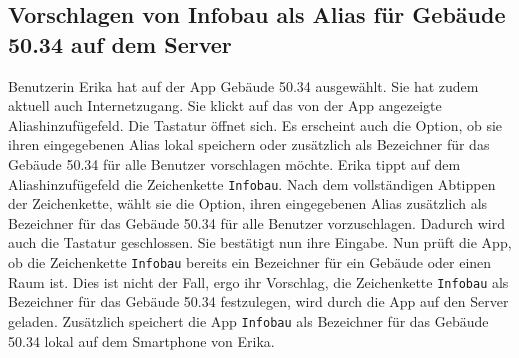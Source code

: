 \subsection{Vorschlagen von Infobau als Alias für Gebäude 50.34 auf dem Server}

Benutzerin Erika hat auf der App Gebäude 50.34 ausgewählt. 
Sie hat zudem aktuell auch Internetzugang. 
Sie klickt auf das von der App angezeigte Aliashinzufügefeld. 
Die Tastatur öffnet sich.  
Es erscheint auch die Option, ob sie ihren eingegebenen Alias lokal speichern oder zusätzlich als Bezeichner für das Gebäude 50.34 für alle Benutzer vorschlagen möchte. 
Erika tippt auf dem Aliashinzufügefeld die Zeichenkette \texttt{Infobau}.
Nach dem vollständigen Abtippen der Zeichenkette, wählt sie die Option, ihren eingegebenen Alias zusätzlich als Bezeichner für das Gebäude 50.34 für alle Benutzer vorzuschlagen. 
Dadurch wird auch die Tastatur geschlossen. 
Sie bestätigt nun ihre Eingabe. 
Nun prüft die App, ob die Zeichenkette \texttt{Infobau} bereits ein Bezeichner für ein Gebäude oder einen Raum ist. 
Dies ist nicht der Fall, ergo ihr Vorschlag, die Zeichenkette \texttt{Infobau} als Bezeichner für das Gebäude 50.34 festzulegen, wird durch die App auf den Server geladen. 
Zusätzlich speichert die App \texttt{Infobau} als Bezeichner für das Gebäude 50.34 lokal auf dem Smartphone von Erika.